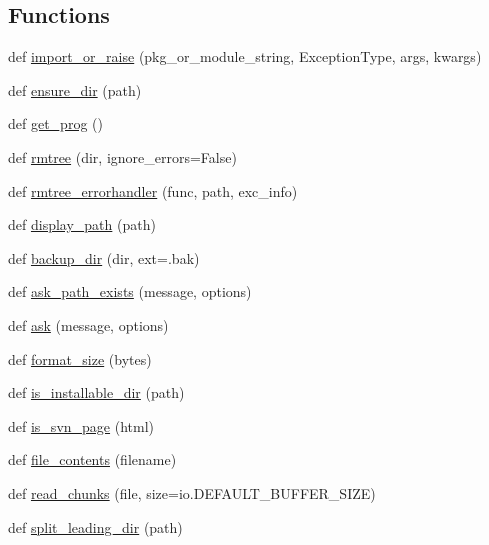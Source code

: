 \subsection*{Functions}
\begin{DoxyCompactItemize}
\item 
def \hyperlink{namespacepip_1_1utils_a7b69957eac502b178052db8ce2deb47b}{import\+\_\+or\+\_\+raise} (pkg\+\_\+or\+\_\+module\+\_\+string, Exception\+Type, args, kwargs)
\item 
def \hyperlink{namespacepip_1_1utils_a72c97d33e166b2014cd630de39d85c68}{ensure\+\_\+dir} (path)
\item 
def \hyperlink{namespacepip_1_1utils_a136ecb41887e8532d27179c39407614c}{get\+\_\+prog} ()
\item 
def \hyperlink{namespacepip_1_1utils_aa8ffe550e48870fe8cd5597b73aeb940}{rmtree} (dir, ignore\+\_\+errors=False)
\item 
def \hyperlink{namespacepip_1_1utils_a68d0b342e03305f7ed07f0aaf73da43a}{rmtree\+\_\+errorhandler} (func, path, exc\+\_\+info)
\item 
def \hyperlink{namespacepip_1_1utils_ad7ee11adc1c02ca35977269fd7515a63}{display\+\_\+path} (path)
\item 
def \hyperlink{namespacepip_1_1utils_a03132151652bc45f9dbdb97fcf954141}{backup\+\_\+dir} (dir, ext=\textquotesingle{}.bak\textquotesingle{})
\item 
def \hyperlink{namespacepip_1_1utils_ab5791ec726e698bd0bb2332407908937}{ask\+\_\+path\+\_\+exists} (message, options)
\item 
def \hyperlink{namespacepip_1_1utils_afc53f59e9436aac85884b5eb3b77e1c5}{ask} (message, options)
\item 
def \hyperlink{namespacepip_1_1utils_a4700a41edc24b69d99c87cb670c2bff2}{format\+\_\+size} (bytes)
\item 
def \hyperlink{namespacepip_1_1utils_aeb4f7dc1a55d3477acedf5c1d4707cec}{is\+\_\+installable\+\_\+dir} (path)
\item 
def \hyperlink{namespacepip_1_1utils_a51d5a53fb1cd54954a9c656b79820b91}{is\+\_\+svn\+\_\+page} (html)
\item 
def \hyperlink{namespacepip_1_1utils_a3f9585fa8d3b4b89bbf87320383780c1}{file\+\_\+contents} (filename)
\item 
def \hyperlink{namespacepip_1_1utils_a79d82feb4a0f6da27c00f79b1a36fcc2}{read\+\_\+chunks} (file, size=io.\+D\+E\+F\+A\+U\+L\+T\+\_\+\+B\+U\+F\+F\+E\+R\+\_\+\+S\+I\+ZE)
\item 
def \hyperlink{namespacepip_1_1utils_a45850f06f136546cf5a836e798995d8d}{split\+\_\+leading\+\_\+dir} (path)

\end{DoxyCompactItemize}
